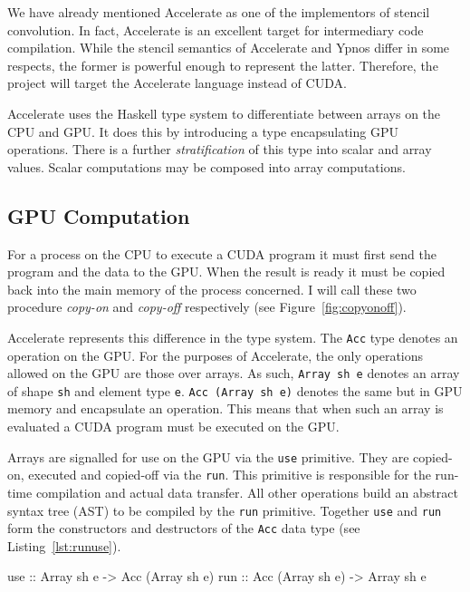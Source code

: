 \documentclass[
    12pt,
    a4paper,
    twoside,
    openright,
    ]{scrbook}
\begin{document}
We have already mentioned Accelerate as one of the implementors of stencil
convolution. In fact, Accelerate is an excellent target for intermediary code
compilation. While the stencil semantics of Accelerate and Ypnos differ in some
respects, the former is powerful enough to represent the latter. Therefore, the
project will target the Accelerate language instead of CUDA.

Accelerate uses the Haskell type system to differentiate between arrays
on the CPU and GPU. It does this by introducing a type encapsulating GPU
operations. There is a further \emph{stratification} of this type into
scalar and array values. Scalar computations may be composed into
array computations.

\subsection{GPU Computation}

For a process on the CPU to execute a CUDA program it must first send
the program and the data to the GPU. When the result is ready it must be copied
back into the main memory of the process concerned. I will call these two
procedure \emph{copy-on} and \emph{copy-off} respectively (see
Figure~\ref{fig:copyonoff}).

Accelerate represents this difference in the type system. The \texttt{Acc} type
denotes an operation on the GPU. For the purposes of Accelerate, the only
operations allowed on the GPU are those over arrays. As such, \texttt{Array sh
  e} denotes an array of shape \texttt{sh} and element type \texttt{e}.
\texttt{Acc (Array sh e)} denotes the same but in GPU memory and encapsulate an
operation. This means that when such an array is evaluated a CUDA program must
be executed on the GPU.

Arrays are signalled for use on the GPU via the \texttt{use} primitive.  They
are copied-on, executed and copied-off via the \texttt{run}. This primitive is
responsible for the run-time compilation and actual data transfer. All other
operations build an abstract syntax tree (AST) to be compiled by the
\texttt{run} primitive. Together \texttt{use} and \texttt{run} form the
constructors and destructors of the \texttt{Acc} data type (see
Listing~\ref{lst:runuse}).

\begin{hflisting}[label={lst:runuse}, caption=The basic constructors and
  destructors for moving arrays too and from the GPU in Accelerate.]
use :: Array sh e -> Acc (Array sh e)
run :: Acc (Array sh e) -> Array sh e
\end{hflisting}
\end{document}
